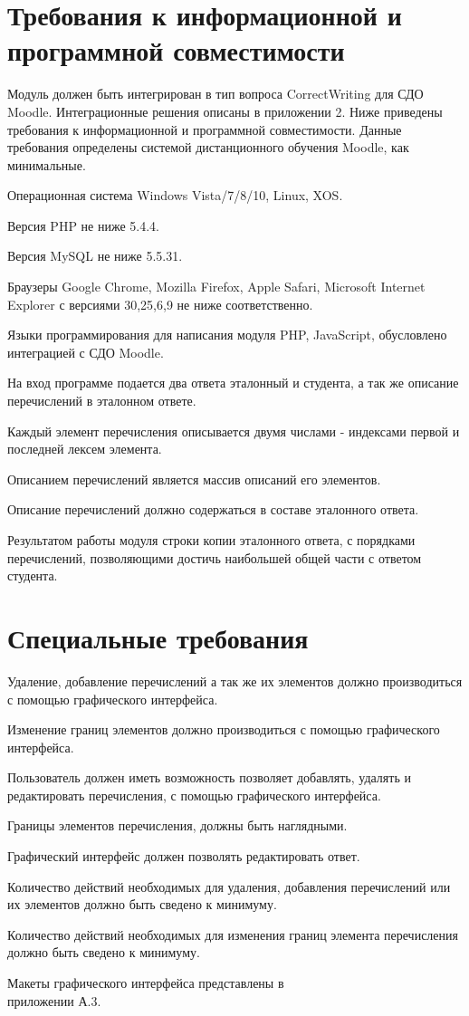 \documentclass[a4paper,english]{G2-105}
\begin{document}
\section{Требования к информационной и программной совместимости}

\par Модуль должен быть интегрирован в тип вопроса CorrectWriting для СДО Moodle. Интеграционные решения описаны в приложении 2. 
Ниже приведены требования к информационной и программной совместимости.
Данные требования определены системой дистанционного обучения Moodle, как минимальные.
\par Операционная система Windows Vista/7/8/10, Linux, XOS.
\par Версия PHP не ниже 5.4.4.
\par Версия MySQL не ниже 5.5.31.
\par Браузеры Google Chrome, Mozilla Firefox, Apple Safari, Microsoft Internet Explorer
с версиями 30,25,6,9 не ниже соответственно.
\par Языки программирования для написания модуля PHP, JavaScript, обусловлено интеграцией с СДО Moodle.
\par На вход программе подается два ответа эталонный и студента, а так же описание
перечислений в эталонном ответе.
\par Каждый элемент перечисления описывается двумя числами - индексами первой и последней лексем элемента.
\par Описанием перечислений является массив описаний его элементов.
\par Описание перечислений должно содержаться в составе эталонного ответа.
\par Результатом работы модуля строки копии эталонного ответа, с порядками
перечислений, позволяющими достичь наибольшей общей части с ответом студента.

\section{Специальные требования}

\par Удаление, добавление перечислений а так же их элементов должно производиться с помощью графического интерфейса.
\par Изменение границ элементов должно производиться с помощью графического интерфейса.
\par Пользователь должен иметь возможность позволяет добавлять, удалять и редактировать перечисления, с помощью графического интерфейса. 
\par Границы элементов перечисления, должны быть наглядными.
\par Графический интерфейс должен позволять редактировать ответ.
\par Количество действий необходимых для удаления, добавления перечислений или их элементов должно быть сведено к минимуму.
\par Количество действий необходимых для изменения границ элемента перечисления должно быть сведено к минимуму.
\par Макеты графического интерфейса представлены в \\ приложении А.3.
\end{document}
